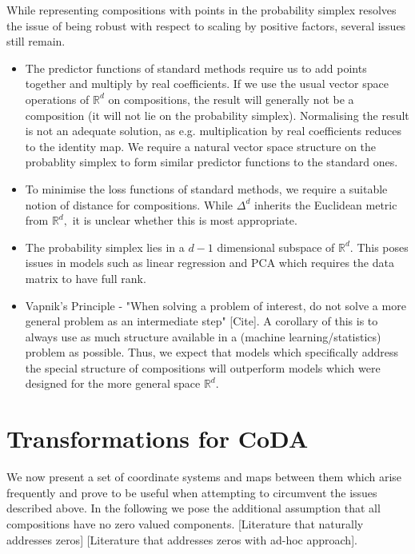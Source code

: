 \documentclass[BSc]{usydthesis}
\numberwithin{equation}{chapter}
\theoremstyle{remark}
\begin{document}
While representing compositions with points in the probability simplex resolves the issue of being robust with respect to scaling by positive factors, several issues still remain.
 \begin{itemize}
  \item The predictor functions of standard methods require us to add points together and multiply by real coefficients. If we use the usual vector space operations of $\mathbb{R}^d$ on compositions, the result will generally not be a composition (it will not lie on the probability simplex). Normalising the result is not an adequate solution, as e.g. multiplication by real coefficients reduces to the identity map. We require a natural vector space structure on the probablity simplex to form similar predictor functions to the standard ones.
 \item To minimise the loss functions of standard methods, we require a suitable notion of distance for compositions. While $\Delta^d$ inherits the Euclidean metric from $\mathbb{R}^d,$ it is unclear whether this is most appropriate.
  \item The probability simplex lies in a $d-1$ dimensional subspace of $\mathbb{R}^d.$ This poses issues in models such as linear regression and PCA which requires the data matrix to have full rank. 
  \item Vapnik's Principle - "When solving a problem of interest, do not solve a more general problem as an intermediate step" [Cite]. A corollary of this is to always use as much structure available in a (machine learning/statistics) problem as possible. Thus, we expect that models which specifically address the special structure of compositions will outperform models which were designed for the more general space $\mathbb{R}^d.$ 
 \end{itemize}

\section{Transformations for CoDA}

We now present a set of coordinate systems and maps between them which arise frequently and prove to be useful when attempting to circumvent the issues described above. In the following we pose the additional assumption that all compositions have no zero valued components.  [Literature that naturally addresses zeros] [Literature that addresses zeros with ad-hoc approach]. 
\end{document}

